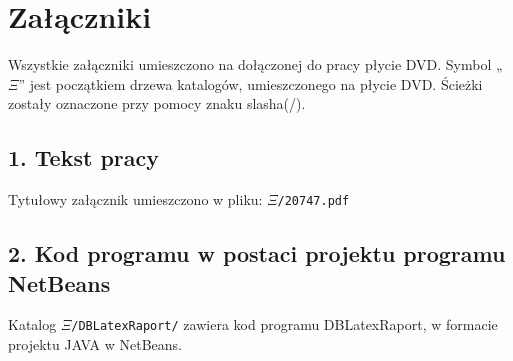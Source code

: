 \documentclass[a4paper,onecolumn,oneside,12pt,wide,floatssmall]{mwrep}
\begin{document}
\renewcommand*\lstlistingname{Wydruk}
\renewcommand*\lstlistlistingname{Spis wydruków}

\renewcommand{\baselinestretch}{1.0}
\raggedbottom


\newpage

\makeatletter
\def\ps@plain{%
  \let\@mkboth\@gobbletwo
  \let\ps@normal\hf@plain
  \let\ps@opening\hf@plain
  \let\ps@closing\hf@plain
  \let\ps@blank\hf@empty
  \ps@normal}
\makeatother
{}
\setcounter{page}{3}
\pagestyle{plain}
\tableofcontents











\listoffigures
\chapter*{Załączniki}
\hspace{3mm} Wszystkie załączniki umieszczono na dołączonej do pracy płycie DVD. Symbol
„$\Xi$” jest początkiem drzewa katalogów, umieszczonego na
płycie DVD. Ścieżki zostały oznaczone przy pomocy znaku slasha(/).
\section{1. \hspace{1mm}Tekst pracy}

\hspace{3mm} Tytułowy załącznik umieszczono w pliku: \texttt{$\Xi$/20747.pdf}

\section{2. \hspace{1mm}Kod programu w postaci projektu programu NetBeans}

\hspace{3mm} Katalog  \texttt{$\Xi$/DBLatexRaport/} zawiera kod programu DBLatexRaport, w formacie projektu JAVA w NetBeans.
\end{document}
